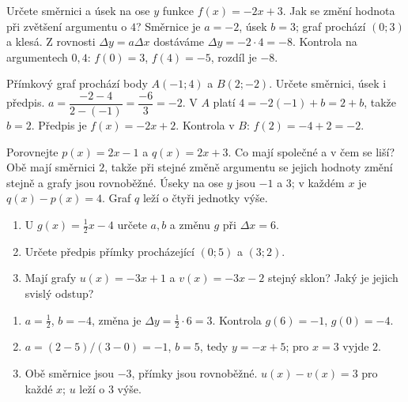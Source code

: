 \documentclass[11pt,a4paper]{article}
\begin{document}
\begin{prikladReseniBox}
Určete směrnici a úsek na ose $y$ funkce $f(x)=-2x+3$. Jak se změní hodnota při zvětšení argumentu o $4$?
\tcblower
Směrnice je $a=-2$, úsek $b=3$; graf prochází $(0;3)$ a klesá. Z rovnosti $\Delta y=a\Delta x$ dostáváme $\Delta y=-2\cdot4=-8$. Kontrola na argumentech $0,4$: $f(0)=3$, $f(4)=-5$, rozdíl je $-8$.
\end{prikladReseniBox}
\begin{prikladReseniBox}
Přímkový graf prochází body $A(-1;4)$ a $B(2;-2)$. Určete směrnici, úsek i předpis.
\tcblower
$a=\dfrac{-2-4}{2-(-1)}=\dfrac{-6}{3}=-2$. V $A$ platí $4=-2(-1)+b=2+b$, takže $b=2$. Předpis je $f(x)=-2x+2$. Kontrola v $B$: $f(2)=-4+2=-2$.
\end{prikladReseniBox}
\begin{prikladReseniBox}
Porovnejte $p(x)=2x-1$ a $q(x)=2x+3$. Co mají společné a v čem se liší?
\tcblower
Obě mají směrnici $2$, takže při stejné změně argumentu se jejich hodnoty změní stejně a grafy jsou rovnoběžné. Úseky na ose $y$ jsou $-1$ a $3$; v každém $x$ je $q(x)-p(x)=4$. Graf $q$ leží o čtyři jednotky výše.
\end{prikladReseniBox}
\begin{zadaniReseniBox}
\begin{enumerate}[label=\alph*)]
\item U $g(x)=\frac12x-4$ určete $a,b$ a změnu $g$ při $\Delta x=6$.
\item Určete předpis přímky procházející $(0;5)$ a $(3;2)$.
\item Mají grafy $u(x)=-3x+1$ a $v(x)=-3x-2$ stejný sklon? Jaký je jejich svislý odstup?
\end{enumerate}
\tcblower
\begin{enumerate}[label=\alph*)]
\item $a=\frac12$, $b=-4$, změna je $\Delta y=\frac12\cdot6=3$. Kontrola $g(6)=-1$, $g(0)=-4$.
\item $a=(2-5)/(3-0)=-1$, $b=5$, tedy $y=-x+5$; pro $x=3$ vyjde $2$.
\item Obě směrnice jsou $-3$, přímky jsou rovnoběžné. $u(x)-v(x)=3$ pro každé $x$; $u$ leží o $3$ výše.
\end{enumerate}
\end{zadaniReseniBox}
\end{document}
